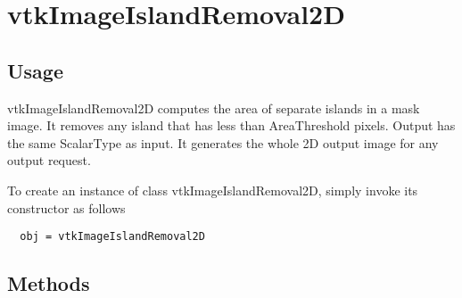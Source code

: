 \section{vtkImageIslandRemoval2D}

\subsection{Usage}

 vtkImageIslandRemoval2D computes the area of separate islands in 
 a mask image.  It removes any island that has less than AreaThreshold
 pixels.  Output has the same ScalarType as input.  It generates
 the whole 2D output image for any output request.

To create an instance of class vtkImageIslandRemoval2D, simply
invoke its constructor as follows
\begin{verbatim}
  obj = vtkImageIslandRemoval2D
\end{verbatim}
\subsection{Methods}

